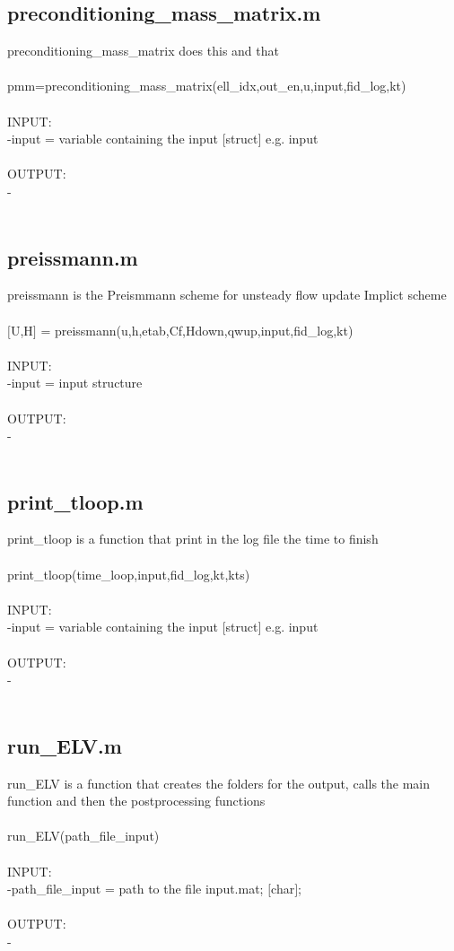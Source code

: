 \subsection{preconditioning\_mass\_matrix.m}
preconditioning\_mass\_matrix does this and that \\ 
 \\ 
pmm=preconditioning\_mass\_matrix(ell\_idx,out\_en,u,input,fid\_log,kt) \\ 
 \\ 
INPUT: \\ 
   -input = variable containing the input $[$struct$]$ e.g. input \\ 
 \\ 
OUTPUT: \\ 
   - \\ 
 \\ 
\subsection{preissmann.m}
preissmann is the Preismmann scheme for unsteady flow update Implict scheme \\ 
 \\ 
$[$U,H$]$ = preissmann(u,h,etab,Cf,Hdown,qwup,input,fid\_log,kt) \\ 
 \\ 
INPUT: \\ 
   -input = input structure \\ 
 \\ 
OUTPUT: \\ 
   - \\ 
 \\ 
\subsection{print\_tloop.m}
print\_tloop is a function that print in the log file the time to finish \\ 
 \\ 
print\_tloop(time\_loop,input,fid\_log,kt,kts) \\ 
 \\ 
INPUT: \\ 
   -input = variable containing the input $[$struct$]$ e.g. input \\ 
 \\ 
OUTPUT: \\ 
   - \\ 
 \\ 
\subsection{run\_ELV.m}
run\_ELV is a function that creates the folders for the output, calls the main function and then the postprocessing functions \\ 
 \\ 
run\_ELV(path\_file\_input) \\ 
 \\ 
INPUT: \\ 
   -path\_file\_input = path to the file input.mat; $[$char$]$; \\ 
 \\ 
OUTPUT: \\ 
   - \\ 
 \\ 
